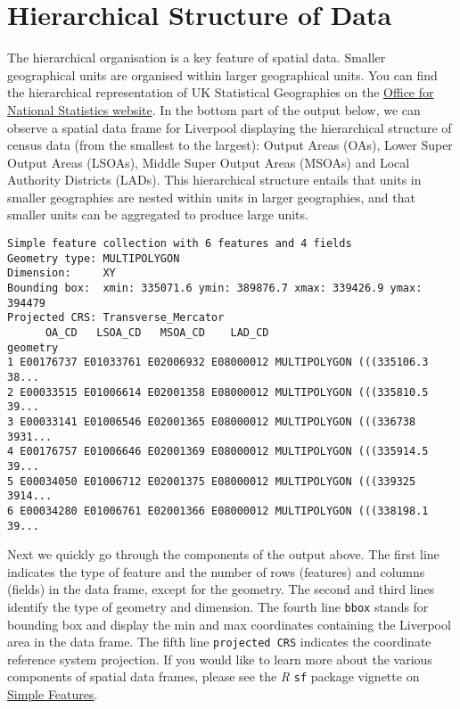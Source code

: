 \documentclass[
  letterpaper,
  krantz2]{style/krantz}
\begin{document}
\hypertarget{hierarchical-structure-of-data}{%
\section{Hierarchical Structure of
Data}\label{hierarchical-structure-of-data}}

The hierarchical organisation is a key feature of spatial data. Smaller
geographical units are organised within larger geographical units. You
can find the hierarchical representation of UK Statistical Geographies
on the
\href{https://geoportal.statistics.gov.uk/search?collection=Document\&sort=name\&tags=all(DOC_HRSG\%2CDEC_2020)}{Office
for National Statistics website}. In the bottom part of the output
below, we can observe a spatial data frame for Liverpool displaying the
hierarchical structure of census data (from the smallest to the
largest): Output Areas (OAs), Lower Super Output Areas (LSOAs), Middle
Super Output Areas (MSOAs) and Local Authority Districts (LADs). This
hierarchical structure entails that units in smaller geographies are
nested within units in larger geographies, and that smaller units can be
aggregated to produce large units.

\begin{verbatim}
Simple feature collection with 6 features and 4 fields
Geometry type: MULTIPOLYGON
Dimension:     XY
Bounding box:  xmin: 335071.6 ymin: 389876.7 xmax: 339426.9 ymax: 394479
Projected CRS: Transverse_Mercator
      OA_CD   LSOA_CD   MSOA_CD    LAD_CD                       geometry
1 E00176737 E01033761 E02006932 E08000012 MULTIPOLYGON (((335106.3 38...
2 E00033515 E01006614 E02001358 E08000012 MULTIPOLYGON (((335810.5 39...
3 E00033141 E01006546 E02001365 E08000012 MULTIPOLYGON (((336738 3931...
4 E00176757 E01006646 E02001369 E08000012 MULTIPOLYGON (((335914.5 39...
5 E00034050 E01006712 E02001375 E08000012 MULTIPOLYGON (((339325 3914...
6 E00034280 E01006761 E02001366 E08000012 MULTIPOLYGON (((338198.1 39...
\end{verbatim}

Next we quickly go through the components of the output above. The first
line indicates the type of feature and the number of rows (features) and
columns (fields) in the data frame, except for the geometry. The second
and third lines identify the type of geometry and dimension. The fourth
line \texttt{bbox} stands for bounding box and display the min and max
coordinates containing the Liverpool area in the data frame. The fifth
line \texttt{projected\ CRS} indicates the coordinate reference system
projection. If you would like to learn more about the various components
of spatial data frames, please see the \emph{R} \texttt{sf} package
vignette on
\href{https://r-spatial.github.io/sf/articles/sf1.html}{Simple
Features}.
\end{document}
